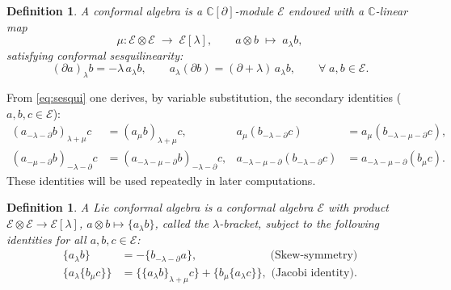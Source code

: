 \documentclass[a4paper,11pt]{article}
\def\Rg{\mathbb{C}[\partial]}
\def\Ep{\mathcal{E}}
\def\la{\lambda}
\def\p{\partial}
\def\C{\mathbb{C}}
\numberwithin{equation}{section}
\newtheorem{definition}[theorem]{Definition}
\begin{document}
\begin{definition}\label{def:conformal-algebra}
A \textit{conformal algebra} is a $\Rg$-module $\Ep$ endowed with a
$\C$-linear map
\[
  \mu : \Ep \otimes \Ep \;\longrightarrow\; \Ep[\lambda],
  \qquad a \otimes b \;\mapsto\; a_\lambda b,
\]
satisfying \emph{conformal sesquilinearity}:
\begin{equation}\label{eq:sesqui}
  (\partial a)_\lambda b = -\lambda\,a_\lambda b,
  \qquad
  a_\lambda(\partial b) = (\partial + \lambda)\,a_\lambda b,
  \qquad \forall\; a, b \in \Ep.
\end{equation}
\end{definition}

From \eqref{eq:sesqui} one derives, by variable substitution, the
secondary identities ($a,b,c\in\Ep$):
\begin{align}
  (a_{-\la-\p}b)_{\la+\mu}c
  &= (a_\mu b)_{\la+\mu}c, &
  a_\mu(b_{-\la-\p}c)
  &= a_\mu(b_{-\la-\mu-\p}c), \label{eq:sesqui-extra1} \\
  (a_{-\mu-\p}b)_{-\la-\p}c
  &= (a_{-\la-\mu-\p}b)_{-\la-\p}c, &
  a_{-\la-\mu-\p}(b_{-\la-\p}c)
  &= a_{-\la-\mu-\p}(b_\mu c). \label{eq:sesqui-extra2}
\end{align}
These identities will be used repeatedly in later computations.


\begin{definition}\label{def:Lie-conf}
A \textit{Lie conformal  algebra} is a conformal algebra  $\Ep$  with product 
$\Ep \otimes \Ep \to \Ep[\lambda]$, $a\otimes b \mapsto \{a_\lambda b\}$,
called the \emph{$\lambda$-bracket}, subject to the following identities  for
all $a,b,c\in\Ep$:
\begin{align}
  \label{Skew-symmetry}
    \{a_\lambda b\} &= -\{b_{-\lambda-\partial}a\},\quad\quad\quad\quad\quad\;\; \;\;\text{ (Skew-symmetry)}\\
  \label{Jacobi identity}
    \{a_\lambda\{b_\mu c\}\}
    & = \{\{a_\lambda b\}_{\lambda+\mu}c\} + \{b_\mu\{a_\lambda c\}\}, \text{ (Jacobi identity)} .
\end{align}
\end{definition}
\end{document}
